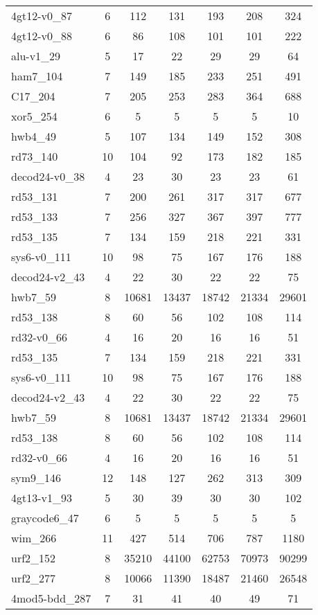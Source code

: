\documentclass[journal]{IEEEtran}
\begin{document}
\begin{table*}[htbp]
\begin{center}
\begin{tabular}{|p{4.3cm}<{\centering}|c|c|c|c|c|c|}
4gt12-v0\_87 & 6 & 112 & 131 & 193 & 208 & 324 \\
4gt12-v0\_88 & 6 & 86 & 108 & 101 & 101 & 222 \\
alu-v1\_29 & 5 & 17 & 22 & 29 & 29 & 64 \\
ham7\_104 & 7 & 149 & 185 & 233 & 251 & 491 \\
C17\_204 & 7 & 205 & 253 & 283 & 364 & 688 \\
xor5\_254 & 6 & 5 & 5 & 5 & 5 & 10 \\
hwb4\_49 & 5 & 107 & 134 & 149 & 152 & 308 \\
rd73\_140 & 10 & 104 & 92 & 173 & 182 & 185 \\
decod24-v0\_38 & 4 & 23 & 30 & 23 & 23 & 61 \\
rd53\_131 & 7 & 200 & 261 & 317 & 317 & 677 \\
rd53\_133 & 7 & 256 & 327 & 367 & 397 & 777 \\
rd53\_135 & 7 & 134 & 159 & 218 & 221 & 331 \\
sys6-v0\_111 & 10 & 98 & 75 & 167 & 176 & 188 \\
decod24-v2\_43 & 4 & 22 & 30 & 22 & 22 & 75 \\
hwb7\_59 & 8 & 10681 & 13437 & 18742 & 21334 & 29601 \\
rd53\_138 & 8 & 60 & 56 & 102 & 108 & 114 \\
rd32-v0\_66 & 4 & 16 & 20 & 16 & 16 & 51 \\
rd53\_135 & 7 & 134 & 159 & 218 & 221 & 331 \\
sys6-v0\_111 & 10 & 98 & 75 & 167 & 176 & 188 \\
decod24-v2\_43 & 4 & 22 & 30 & 22 & 22 & 75 \\
hwb7\_59 & 8 & 10681 & 13437 & 18742 & 21334 & 29601 \\
rd53\_138 & 8 & 60 & 56 & 102 & 108 & 114 \\
rd32-v0\_66 & 4 & 16 & 20 & 16 & 16 & 51 \\
sym9\_146 & 12 & 148 & 127 & 262 & 313 & 309 \\
4gt13-v1\_93 & 5 & 30 & 39 & 30 & 30 & 102 \\
graycode6\_47 & 6 & 5 & 5 & 5 & 5 & 5 \\
wim\_266 & 11 & 427 & 514 & 706 & 787 & 1180 \\
urf2\_152 & 8 & 35210 & 44100 & 62753 & 70973 & 90299 \\
urf2\_277 & 8 & 10066 & 11390 & 18487 & 21460 & 26548 \\
4mod5-bdd\_287 & 7 & 31 & 41 & 40 & 49 & 71 \\

\end{tabular}
\end{center}
\end{table*}
\end{document}
